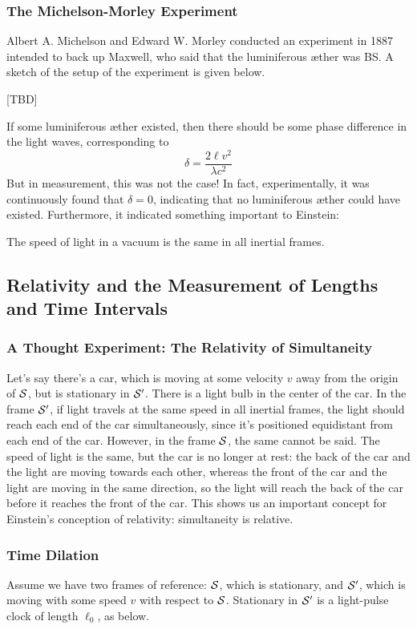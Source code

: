 \documentclass[a4paper]{article}
\begin{document}
\subsubsection{The Michelson-Morley Experiment}
Albert A. Michelson and Edward W. Morley conducted an experiment in 1887
intended to back up Maxwell, who said that the luminiferous \ae ther was
BS. A sketch of the setup of the experiment is given below.

[TBD]

If some luminiferous \ae ther existed, then there should be some phase
difference in the light waves, corresponding to
\[ \delta = \frac{2\ell v^2}{\lambda c^2} \]
But in measurement, this was not the case! In fact, experimentally, it
was continuously found that $\delta = 0$, indicating that no luminiferous
\ae ther could have existed. Furthermore, it indicated something important
to Einstein:
\begin{post}
	The speed of light in a vacuum is the same in all inertial frames.
\end{post}

\subsection{Relativity and the Measurement of Lengths and Time Intervals}
\setcounter{subsubsection}{-1}
\subsubsection{A Thought Experiment: The Relativity of Simultaneity}
Let's say there's a car, which is moving at some velocity $v$ away from the
origin of $\S$, but is stationary in $\S'$. There is a light bulb in the center
of the car.
In the frame $\S'$, if light travels at the same speed in all
inertial frames, the light should reach each end of the car simultaneously,
since it's positioned equidistant from each end of the car. However, in the
frame $\S$, the same cannot be said. The speed of light is the same, but the
car is no longer at rest: the back of the car and the light are moving towards
each other, whereas the front of the car and the light are moving in the same
direction, so the light will reach the back of the car before it reaches the
front of the car. This shows us an important concept for Einstein's conception
of relativity: simultaneity is relative.

\subsubsection{Time Dilation}
Assume we have two frames of reference: $\S$, which is stationary, and
$\S'$, which is moving with some speed $v$ with respect to $\S$. Stationary in
$\S'$ is a light-pulse clock of length $\ell_0$, as below.
\end{document}
